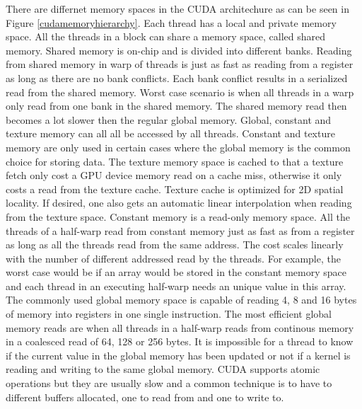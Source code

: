 There are differnet memory spaces in the CUDA architechure as can be seen in Figure \ref{cudamemoryhierarchy}. Each thread has a local and private memory space. All the threads in a block can share a memory space, called shared memory. Shared memory is on-chip and is divided into different banks. Reading from shared memory in warp of threads is just as fast as reading from a register as long as there are no bank conflicts. Each bank conflict results in a serialized read from the shared memory. Worst case scenario is when all threads in a warp only read from one bank in the shared memory. The shared memory read then becomes a lot slower then the regular global memory. Global, constant and texture memory can all all be accessed by all threads. Constant and texture memory are only used in certain cases where the global memory is the common choice for storing data. The texture memory space is cached to that a texture fetch only cost a GPU device memory read on a cache miss, otherwise it only costs a read from the texture cache. Texture cache is optimized for 2D spatial locality. If desired, one also gets an automatic linear interpolation when reading from the texture space. Constant memory is a read-only memory space. All the threads of a half-warp read from constant memory just as fast as from a register as long as all the threads read from the same address. The cost scales linearly with the number of different addressed read by the threads. For example, the worst case would be if an array would be stored in the constant memory space and each thread in an executing half-warp needs an unique value in this array. The commonly used global memory space is capable of reading 4, 8 and 16 bytes of memory into registers in one single instruction. The most efficient global memory reads are when all threads in a half-warp reads from continous memory in a coalesced read of 64, 128 or 256 bytes. It is impossible for a thread to know if the current value in the global memory  has been updated or not if a kernel is reading and writing to the same global memory. CUDA supports atomic operations but they are usually slow and a common technique is to have to different buffers allocated, one to read from and one to write to.



